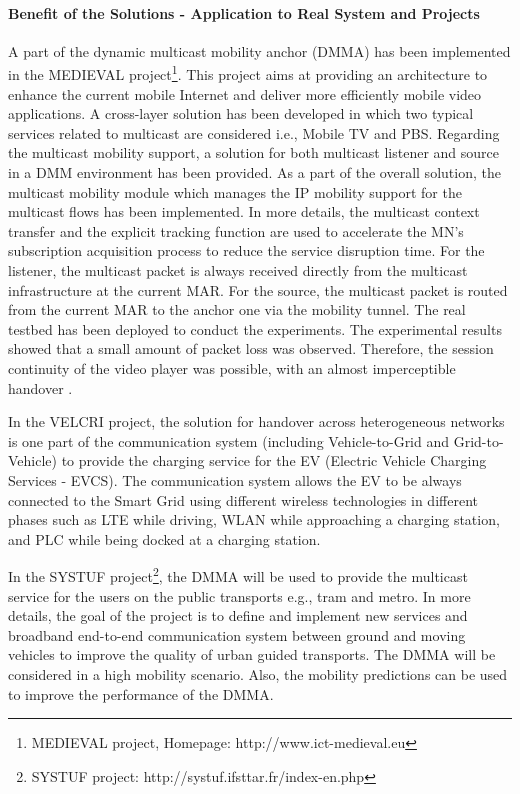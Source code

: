 \paragraph{Benefit of the Solutions - Application to Real System and Projects}
A part of the dynamic multicast mobility anchor (DMMA) has been implemented in the MEDIEVAL project\footnote{MEDIEVAL project, Homepage: http://www.ict-medieval.eu}. This project aims at providing an architecture to enhance the current mobile Internet and deliver more efficiently mobile video applications. A cross-layer solution has been developed in which two typical services related to multicast are considered i.e., Mobile TV and PBS. Regarding the multicast mobility support, a solution for both multicast listener and source in a DMM environment has been provided. As a part of the overall solution, the multicast mobility module which manages the IP mobility support for the multicast flows has been implemented. In more details, the multicast context transfer and the explicit tracking function are used to accelerate the MN's subscription acquisition process to reduce the service disruption time. For the listener, the multicast packet is always received directly from the multicast infrastructure at the current MAR. For the source, the multicast packet is routed from the current MAR to the anchor one via the mobility tunnel. The real testbed has been deployed to conduct the experiments. The experimental results showed that a small amount of packet loss was observed. Therefore, the session continuity of the video player was possible, with an almost imperceptible handover \cite{ICC_Sergio}.

In the VELCRI project, the solution for handover across heterogeneous networks is one part of the communication system (including Vehicle-to-Grid and Grid-to-Vehicle) to provide the charging service for the EV (Electric Vehicle Charging Services - EVCS). The communication system allows the EV to be always connected to the Smart Grid using different wireless technologies in different phases such as LTE while driving, WLAN while approaching a charging station, and PLC while being docked at a charging station. 

In the SYSTUF project\footnote{SYSTUF project: http://systuf.ifsttar.fr/index-en.php}, the DMMA will be used to provide the multicast service for the users on the public transports e.g., tram and metro. In more details, the goal of the project is to define and implement new services and broadband end-to-end communication system between ground and moving vehicles to improve the quality of urban guided transports. The DMMA will be considered in a high mobility scenario. Also, the mobility predictions can be used to improve the performance of the DMMA. 

